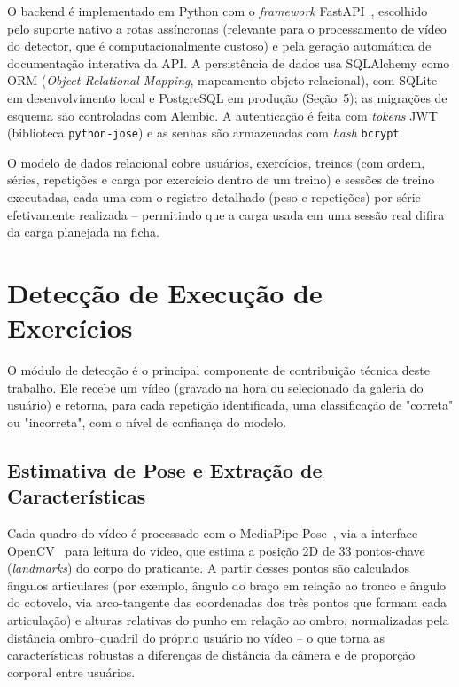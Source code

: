 \documentclass[12pt]{article}
\begin{document}
O backend é implementado em Python com o \textit{framework}
FastAPI~\cite{fastapi}, escolhido pelo suporte nativo a rotas assíncronas
(relevante para o processamento de vídeo do detector, que é
computacionalmente custoso) e pela geração automática de documentação
interativa da API. A persistência de dados usa SQLAlchemy como ORM (\textit{Object-Relational Mapping}, mapeamento
objeto-relacional), com
SQLite em desenvolvimento local e PostgreSQL em produção (Seção~5); as
migrações de esquema são controladas com Alembic. A autenticação é feita
com \textit{tokens} JWT (biblioteca \texttt{python-jose}) e as senhas são
armazenadas com \textit{hash} \texttt{bcrypt}.

O modelo de dados relacional cobre usuários, exercícios, treinos (com
ordem, séries, repetições e carga por exercício dentro de um treino) e
sessões de treino executadas, cada uma com o registro detalhado (peso e
repetições) por série efetivamente realizada -- permitindo que a carga
usada em uma sessão real difira da carga planejada na ficha.

\section{Detecção de Execução de Exercícios}

O módulo de detecção é o principal componente de contribuição técnica
deste trabalho. Ele recebe um vídeo (gravado na hora ou selecionado da
galeria do usuário) e retorna, para cada repetição identificada, uma
classificação de "correta" ou "incorreta", com o nível de confiança do
modelo.

\subsection{Estimativa de Pose e Extração de Características}

Cada quadro do vídeo é processado com o MediaPipe
Pose~\cite{lugaresi2019mediapipe}, via a interface OpenCV~\cite{bradski2000opencv}
para leitura do vídeo, que estima a posição 2D de 33 pontos-chave (\textit{landmarks})
do corpo do praticante. A partir desses pontos são calculados ângulos
articulares (por exemplo, ângulo do braço em relação ao tronco e ângulo do
cotovelo, via arco-tangente das coordenadas dos três pontos que formam
cada articulação) e alturas relativas do punho em relação ao ombro,
normalizadas pela distância ombro--quadril do próprio usuário no vídeo --
o que torna as características robustas a diferenças de distância da
câmera e de proporção corporal entre usuários.
\end{document}
